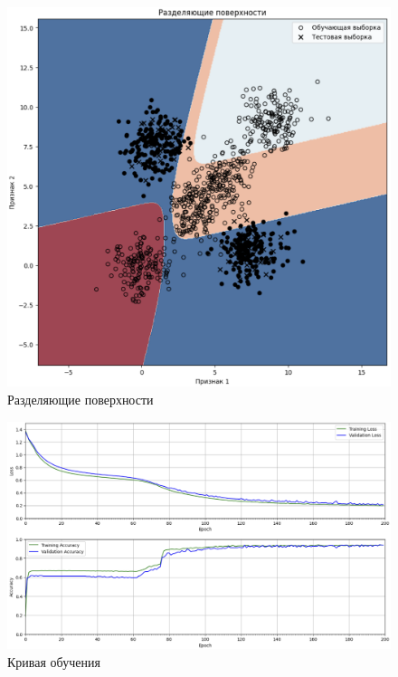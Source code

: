 \begin{figure}
	\begin{center}
		\includegraphics[width=\textwidth]{images/7.png}
	\end{center}
	\caption{Разделяющие поверхности}
	\label{img:7}
\end{figure}

\begin{figure}
	\begin{center}
		\includegraphics[width=\textwidth]{images/8.png}
	\end{center}
	\caption{Кривая обучения}
	\label{img:8}
\end{figure}

